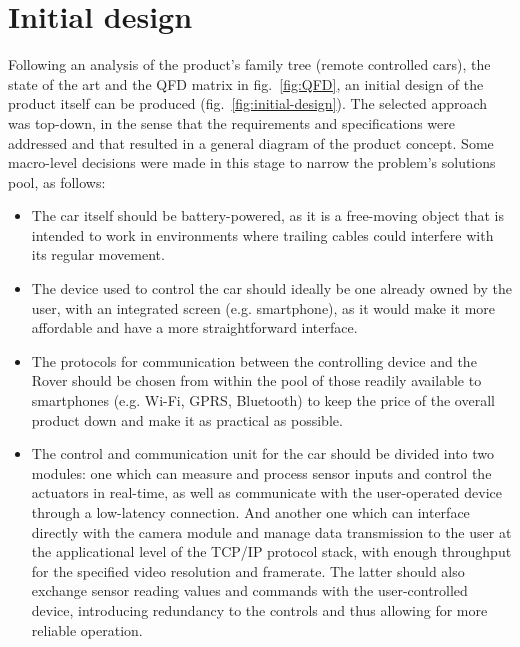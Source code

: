 \newpage
\section{Initial design}%
\label{sec:org68fdd80}

Following an analysis of the product’s family tree (remote controlled cars), the state of the art and the QFD matrix in fig.~\ref{fig:QFD}, an initial design of the product itself can be produced (fig.~\ref{fig:initial-design}).
The selected approach was top-down, in the sense that the requirements and specifications were addressed and that resulted in a general diagram of the product concept. Some macro-level decisions were made in this stage to narrow the problem’s solutions pool, as follows:

\begin{itemize}
\item  The car itself should be battery-powered, as it is a free-moving object that is intended to work in environments where trailing cables could interfere with its regular movement.

\item The device used to control the car should ideally be one already owned by the user, with an integrated screen (e.g. smartphone), as it would make it more affordable and have a more straightforward interface.

\item The protocols for communication between the controlling device and the Rover should be chosen from within the pool of those readily available to smartphones (e.g. Wi-Fi, GPRS, Bluetooth) to keep the price of the overall product down and make it as practical as possible.

\item  The control and communication unit for the car should be divided into two modules: one which can measure and process sensor inputs and control the actuators in real-time, as well as communicate with the user-operated device through a low-latency connection. And another one which can interface directly with the camera module and manage data transmission to the user at the applicational level of the TCP/IP protocol stack, with enough throughput for the specified video resolution and framerate. The latter should also exchange sensor reading values and commands with the user-controlled device, introducing redundancy to the controls and thus allowing for more reliable operation.

\end{itemize}

